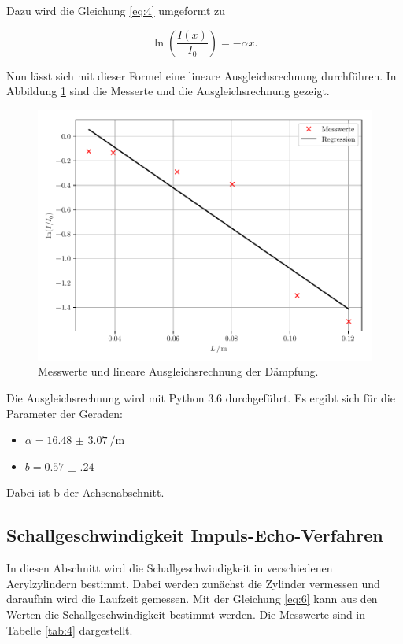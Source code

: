 Dazu wird die Gleichung \ref{eq:4} umgeformt zu

\begin{equation*}
 \ln \left(\frac{I(x)}{I_0}\right) = - \alpha x.
\end{equation*}

Nun lässt sich mit dieser Formel eine lineare Ausgleichsrechnung durchführen.
In Abbildung \ref{abb:2} sind die Messerte und die Ausgleichsrechnung gezeigt.

\begin{figure}[H]
  \centering
  \includegraphics[width=\textwidth]{plot1.pdf}
  \caption{Messwerte und lineare Ausgleichsrechnung der Dämpfung.}
  \label{abb:2}
\end{figure}

Die Ausgleichsrechnung wird mit Python 3.6 durchgeführt. Es ergibt sich für die Parameter
der Geraden:

\begin{itemize}
  \item $\alpha = \SI[per-mode=fraction]{16.48(307)}{\per\meter}$
  \item $b = \num{0.57(24)}$
\end{itemize}

Dabei ist b der Achsenabschnitt.

\subsection{Schallgeschwindigkeit Impuls-Echo-Verfahren}

In diesen Abschnitt wird die Schallgeschwindigkeit in verschiedenen Acrylzylindern
bestimmt. Dabei werden zunächst die Zylinder vermessen und daraufhin wird die Laufzeit
gemessen. Mit der Gleichung \ref{eq:6} kann aus den Werten die Schallgeschwindigkeit
bestimmt werden. Die Messwerte sind in Tabelle \ref{tab:4} dargestellt.

